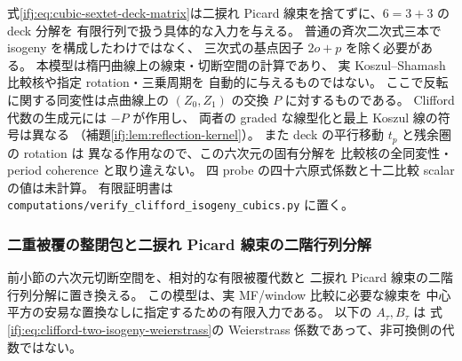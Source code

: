 \begin{remark}[高次比較への有限入力とその限界]
\label{ifj:rem:cubic-sextet-scope}
式\eqref{ifj:eq:cubic-sextet-deck-matrix}は二捩れ
Picard 線束を捨てずに、$6=3+3$ の deck 分解を
有限行列で扱う具体的な入力を与える。
普通の斉次二次式三本で isogeny を構成したわけではなく、
三次式の基点因子 $2o+p$ を除く必要がある。
本模型は楕円曲線上の線束・切断空間の計算であり、
実 Koszul--Shamash 比較核や指定 rotation・三乗周期を
自動的に与えるものではない。
ここで反転に関する同変性は点曲線上の
$(Z_0,Z_1)$ の交換 $P$ に対するものである。
Clifford 代数の生成元には $-P$ が作用し、
両者の graded な線型化と最上 Koszul 線の符号は異なる
（補題\ref{ifj:lem:reflection-kernel}）。
また deck の平行移動 $t_p$ と残余圏の rotation は
異なる作用なので、この六次元の固有分解を
比較核の全同変性・period coherence と取り違えない。
四 probe の四十六原式係数と十二比較 scalar の値は未計算。
有限証明書は
\texttt{computations/verify\_clifford\_isogeny\_cubics.py}
に置く。
\end{remark}

\subsubsection{二重被覆の整閉包と二捩れ Picard 線束の二階行列分解}
\label{ifj:subsubsec:double-cover-mf}

前小節の六次元切断空間を、相対的な有限被覆代数と
二捩れ Picard 線束の二階行列分解に置き換える。
この模型は、実 MF/window 比較に必要な線束を
中心平方の安易な置換なしに指定するための有限入力である。
以下の $A_\tau,B_\tau$ は
式\eqref{ifj:eq:clifford-two-isogeny-weierstrass}の
Weierstrass 係数であって、非可換側の代数ではない。

